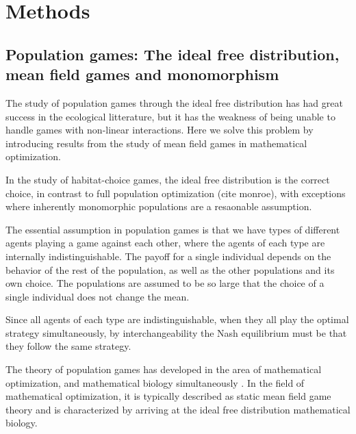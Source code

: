 \section*{Methods}

\subsection*{Population games: The ideal free distribution, mean field games and monomorphism}

The study of population games through the ideal free distribution has had great success in the ecological litterature, but it has the weakness of being unable to handle games with non-linear interactions. Here we solve this problem by introducing results from the study of mean field games in mathematical optimization.


In the study of habitat-choice games, the ideal free distribution is the correct choice, in contrast to full population optimization (cite monroe), with exceptions where inherently monomorphic populations are a resaonable assumption.



The essential assumption in population games is that we have  types of different agents playing a game against each other, where the agents of each type are internally indistinguishable. The payoff for a single individual depends on the behavior of the rest of the population, as well as the other populations and its own choice. The populations are assumed to be so large that the choice of a single individual does not change the mean.

Since all agents of each type are indistinguishable, when they all play the optimal strategy simultaneously, by interchangeability the Nash equilibrium must be that they follow the same strategy.

The theory of population games has developed in the area of mathematical optimization, \citep{aumann} and mathematical biology simultaneously \citep{cressman,kvivran,etc}. In the field of mathematical optimization, it is typically described as static mean field game theory and is characterized by arriving at the ideal free distribution mathematical biology.

